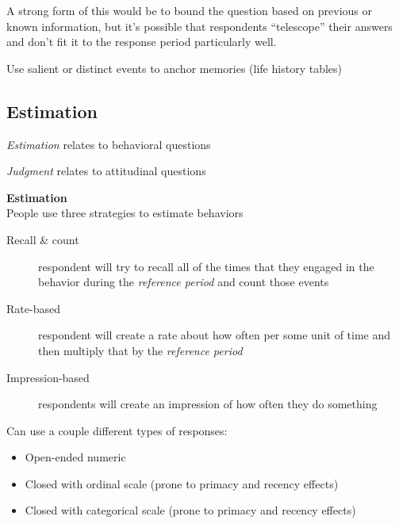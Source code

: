 \documentclass[11pt]{lecturenotes}
\begin{document}
A strong form of this would be to bound the question based on previous or known information, but it's possible that respondents ``telescope'' their answers and don't fit it to the response period particularly well. 

Use salient or distinct events to anchor memories (life history tables)

\subsection[20]{Estimation}

\emph{Estimation} relates to behavioral questions

\emph{Judgment} relates to attitudinal questions

\slide
\textbf{Estimation}\\
People use three strategies to estimate behaviors\\
\begin{minipage}{.75\textwidth}
\begin{description}
\item[Recall \& count] respondent will try to recall all of the times that they engaged in the behavior during the \emph{reference period} and count those events
\item[Rate-based] respondent will create a rate about how often per some unit of time and then multiply that by the \emph{reference period}
\item[Impression-based] respondents will create an impression of how often they do something
\end{description}
\end{minipage}%
\begin{minipage}{.24\textwidth}
\begin{center}
\end{center}
\end{minipage}

Can use a couple different types of responses:
\begin{itemize}
\item Open-ended numeric
\item Closed with ordinal scale (prone to primacy and re\-cen\-cy effects)
\item Closed with categorical scale (prone to primacy and re\-cen\-cy effects)
\end{itemize}
\end{document}
